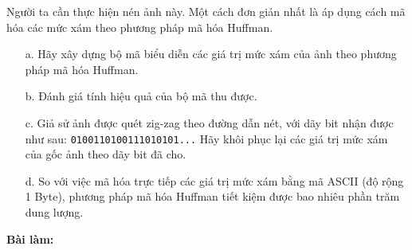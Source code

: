 \documentclass[12pt]{article}
\begin{document}
\begin{enumerate}
\text Người ta cần thực hiện nén ảnh này. Một cách đơn giản nhất là áp dụng cách mã hóa các mức xám theo phương pháp mã hóa Huffman.
\end{enumerate}

\begin{enumerate}
    \item[a.] Hãy xây dựng bộ mã biểu diễn các giá trị mức xám của ảnh theo phương pháp mã hóa Huffman.
    \item[b.] Đánh giá tính hiệu quả của bộ mã thu được.
    \item[c.] Giả sử ảnh được quét zig-zag theo đường dẫn nét, với dãy bit nhận được như sau: 
    \texttt{0100110100111010101...} 
    Hãy khôi phục lại các giá trị mức xám của gốc ảnh theo dãy bit đã cho.
    \item[d.] So với việc mã hóa trực tiếp các giá trị mức xám bằng mã ASCII (độ rộng 1 Byte), phương pháp mã hóa Huffman tiết kiệm được bao nhiêu phần trăm dung lượng.
\end{enumerate}
\par\noindent\textbf{Bài làm:}
\end{document}
